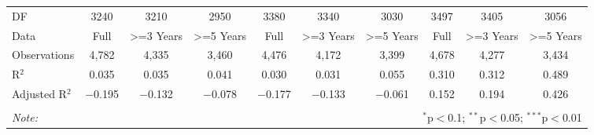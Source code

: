 \documentclass[a4paper,nobind]{templates/ociamthesis}
\begin{document}
\begin{landscape}
\begin{table}[!htbp]
\begin{tabular}{@{\extracolsep{5pt}}lccccccccc}
DF & 3240 & 3210 & 2950 & 3380 & 3340 & 3030 & 3497 & 3405 & 3056 \\ 
Data & Full & >=3 Years & >=5 Years & Full & >=3 Years & >=5 Years & Full & >=3 Years & >=5 Years \\ 
Observations & 4,782 & 4,335 & 3,460 & 4,476 & 4,172 & 3,399 & 4,678 & 4,277 & 3,434 \\ 
R$^{2}$ & 0.035 & 0.035 & 0.041 & 0.030 & 0.031 & 0.055 & 0.310 & 0.312 & 0.489 \\ 
Adjusted R$^{2}$ & $-$0.195 & $-$0.132 & $-$0.078 & $-$0.177 & $-$0.133 & $-$0.061 & 0.152 & 0.194 & 0.426 \\ 
\hline 
\hline \\[-1.8ex] 
\textit{Note:}  & \multicolumn{9}{r}{$^{*}$p$<$0.1; $^{**}$p$<$0.05; $^{***}$p$<$0.01} \\ 
\end{tabular} 
\end{table}

\end{landscape}
\end{document}
